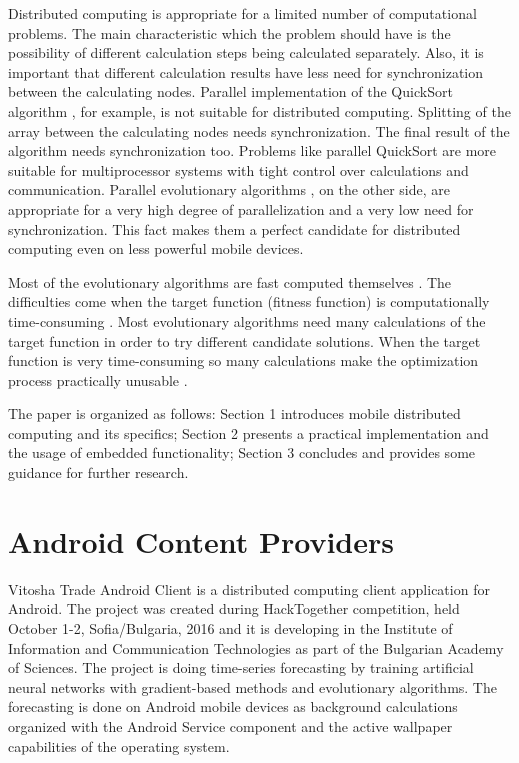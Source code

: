 \documentclass{ifacconf}
\begin{document}
Distributed computing is appropriate for a limited number of computational problems. The main characteristic which the problem should have is the possibility of different calculation steps being calculated separately. Also, it is important that different calculation results have less need for synchronization between the calculating nodes. Parallel implementation of the QuickSort algorithm \cite{Sanders-1997-a}, for example, is not suitable for distributed computing. Splitting of the array between the calculating nodes needs synchronization. The final result of the algorithm needs synchronization too. Problems like parallel QuickSort are more suitable for multiprocessor systems with tight control over calculations and communication. Parallel evolutionary algorithms \cite{Sudholt-2015-a}, on the other side, are appropriate for a very high degree of parallelization and a very low need for synchronization. This fact makes them a perfect candidate for distributed computing even on less powerful mobile devices. 

Most of the evolutionary algorithms are fast computed themselves \cite{Vural-2012-a}. The difficulties come when the target function (fitness function) is computationally time-consuming \cite{Di-Pietro-2004-a}. Most evolutionary algorithms need many calculations of the target function in order to try different candidate solutions. When the target function is very time-consuming so many calculations make the optimization process practically unusable \cite{Lee-2015-a}. 

The paper is organized as follows: Section 1 introduces mobile distributed computing and its specifics; Section 2 presents a practical implementation and the usage of embedded functionality; Section 3 concludes and provides some guidance for further research. 

\section{Android Content Providers}

Vitosha Trade Android Client \cite{Balabanov-2016-1} is a distributed computing client application for Android. The project was created during HackTogether competition, held October 1-2, Sofia/Bulgaria, 2016 and it is developing in the Institute of Information and Communication Technologies as part of the Bulgarian Academy of Sciences. The project is doing time-series forecasting by training artificial neural networks with gradient-based methods and evolutionary algorithms. The forecasting is done on Android mobile devices as background calculations organized with the Android Service component and the active wallpaper capabilities of the operating system. 
\end{document}
